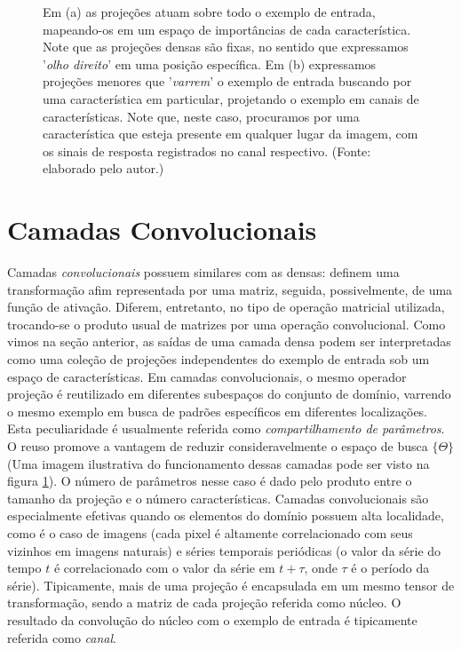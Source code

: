 \begin{figure}[ht!]
\begin{center}
\begin{subfigure}{0.6\textwidth}
		\caption{}
	\end{subfigure}
	\end{center}
	\small Em (a) as projeções atuam sobre todo o exemplo de entrada, mapeando-os em um espaço de importâncias de cada característica. Note que as projeções densas são fixas, no sentido que expressamos '\textit{olho direito}' em uma posição específica. Em (b) expressamos projeções menores que '\textit{varrem}' o exemplo de entrada buscando por uma característica em particular, projetando o exemplo em canais de características. Note que, neste caso, procuramos por uma característica que esteja presente em qualquer lugar da imagem, com os sinais de resposta registrados no canal respectivo. (Fonte: elaborado pelo autor.)
	\label{conv_lin}
\end{figure}

\section{Camadas Convolucionais}

Camadas \textit{convolucionais} \cite{LeCun1989, LeCun98} possuem similares com as densas: definem uma transformação afim representada por uma matriz, seguida, possivelmente, de uma função de ativação. Diferem, entretanto, no tipo de operação matricial utilizada, trocando-se o produto usual de matrizes por uma operação convolucional. Como vimos na seção anterior, as saídas de uma camada densa podem ser interpretadas como uma coleção de projeções independentes do exemplo de entrada sob um espaço de características. Em camadas convolucionais, o mesmo operador projeção é reutilizado em diferentes subespaços do conjunto de domínio, varrendo o mesmo exemplo em busca de padrões específicos em diferentes localizações. Esta peculiaridade é usualmente referida como \textit{compartilhamento de parâmetros}. O reuso promove a vantagem de reduzir consideravelmente o espaço de busca $\{\Theta\}$ (Uma imagem ilustrativa do funcionamento dessas camadas pode ser visto na figura \ref{conv_lin}). O número de parâmetros nesse caso é dado pelo produto entre o tamanho da projeção e o número características. Camadas convolucionais são especialmente efetivas quando os elementos do domínio possuem alta localidade, como é o caso de imagens (cada pixel é altamente correlacionado com seus vizinhos em imagens naturais) e séries temporais periódicas (o valor da série do tempo $t$ é correlacionado com o valor da série em $t + \tau$, onde $\tau$ é o período da série). Tipicamente, mais de uma projeção é encapsulada em um mesmo tensor de transformação, sendo a matriz de cada projeção referida como núcleo. O resultado da convolução do núcleo com o exemplo de entrada é tipicamente referida como \textit{canal}.

